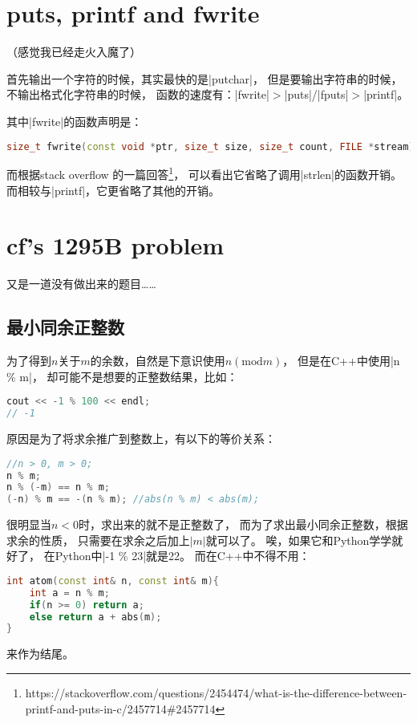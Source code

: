 \section{puts, printf and fwrite}

（感觉我已经走火入魔了）

首先输出一个字符的时候，其实最快的是\vb|putchar|，
但是要输出字符串的时候，不输出格式化字符串的时候，
函数的速度有：\vb|fwrite|$>$\vb|puts|/\vb|fputs|$>$\vb|printf|。

其中\vb|fwrite|的函数声明是：
\begin{lstlisting}[language=C++]
size_t fwrite(const void *ptr, size_t size, size_t count, FILE *stream);
\end{lstlisting}

而根据stack overflow
的一篇回答\footnote{https://stackoverflow.com/questions/2454474/what-is-the-difference-between-printf-and-puts-in-c/2457714\#2457714}，
可以看出它省略了调用\vb|strlen|的函数开销。
而相较与\vb|printf|，它更省略了其他的开销。


\section{cf's 1295B problem}

又是一道没有做出来的题目\ldots\ldots

\subsection{最小同余正整数}
为了得到$n$关于$m$的余数，自然是下意识使用$n (\text{mod} m)$，
但是在C++中使用\vb|n \% m|，
却可能不是想要的正整数结果，比如：
\begin{lstlisting}[language=C++]
cout << -1 % 100 << endl;
// -1
\end{lstlisting}

原因是为了将求余推广到整数上，有以下的等价关系：
\begin{lstlisting}[language=C++]
//n > 0, m > 0;
n % m;
n % (-m) == n % m;
(-n) % m == -(n % m); //abs(n % m) < abs(m);
\end{lstlisting}
很明显当$n<0$时，求出来的就不是正整数了，
而为了求出最小同余正整数，根据求余的性质，
只需要在求余之后加上$|m|$就可以了。
唉，如果它和Python学学就好了，
在Python中\vb|-1 \% 23|就是22。
而在C++中不得不用：
\begin{lstlisting}[language=C++]
int atom(const int& n, const int& m){
    int a = n % m;
    if(n >= 0) return a;
    else return a + abs(m);
}
\end{lstlisting}
来作为结尾。

